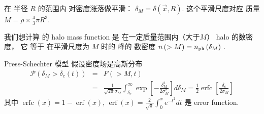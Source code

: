 在 半径 $R$ 的范围内 对密度涨落做平滑： 
$\delta_M = \delta\left(\vec{x},R\right) $. 
这个平滑尺度对应 质量 $M=\bar{\rho} \times \frac{4}{3} \pi R^3$.

我们想计算 的 halo mass function 是 在一定质量范围内（大于$M$） halo 的数密度，
它 等于
在平滑尺度为 $M$ 时的  峰的 数密度
$n\left(>M\right) = n _{\rm{pk}} \left(\delta_M\right)$ .

Press-Schechter 模型
假设密度场是高斯分布
\begin{eqnarray}
    \mathcal{P}\left(\delta_{M}>\delta_{c}(t)\right) &=& F(>M, t) \\ 
    &=& \frac{1}{\sqrt{2 \pi} \sigma_{M}} \int_{\delta_{c}}^{\infty} \exp \left[-\frac{\delta_{M}^{2}}{2 \sigma_{M}^{2}}\right] d \delta_{M}=\frac{1}{2} \operatorname{erfc}\left[\frac{\delta_{c}}{2 \sigma_{M}}\right]
\end{eqnarray}
其中 $\operatorname{erfc}(x)=1-\operatorname{erf}(x)$, $\operatorname{erf}(x)=\frac{2}{\sqrt{\pi}} \int_{0}^{x} e^{-t^{2}} d t$ 是  error function.